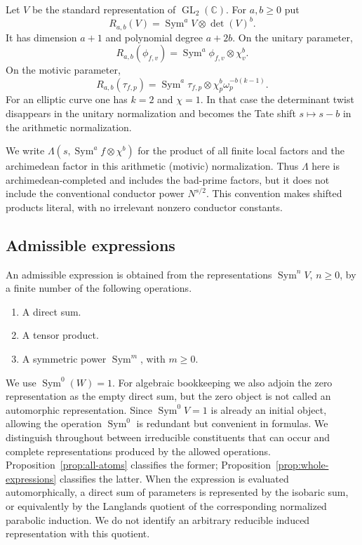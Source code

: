 \documentclass[11pt,reqno]{amsart}
\theoremstyle{definition}
\theoremstyle{remark}
\newcommand{\C}{\mathbb C}
\newcommand{\GL}{\operatorname{GL}}
\newcommand{\Sym}{\operatorname{Sym}}
\begin{document}
Let $V$ be the standard representation of $\GL_2(\C)$.
For $a,b\geq0$ put
\begin{equation}\label{eq:Rab}
 R_{a,b}(V)=\Sym^aV\otimes\det(V)^b.
\end{equation}
It has dimension $a+1$ and polynomial degree $a+2b$.
On the unitary parameter,
\begin{equation}\label{eq:Rab-unitary-general}
 R_{a,b}(\phi_{f,v})
 =\Sym^a\phi_{f,v}\otimes\chi_v^b.
\end{equation}
On the motivic parameter,
\begin{equation}\label{eq:Rab-motivic}
 R_{a,b}(\tau_{f,p})
 =\Sym^a\tau_{f,p}\otimes\chi_p^b\omega_p^{-b(k-1)}.
\end{equation}
For an elliptic curve one has $k=2$ and $\chi=1$.
In that case the determinant twist disappears in the unitary normalization and becomes the Tate shift $s\mapsto s-b$ in the arithmetic normalization.

We write $\Lambda(s,\Sym^af\otimes\chi^b)$ for the product of all finite local factors and the archimedean factor in this arithmetic (motivic) normalization.
Thus $\Lambda$ here is archimedean-completed and includes the bad-prime factors, but it does not include the conventional conductor power $N^{s/2}$.
This convention makes shifted products literal, with no irrelevant nonzero conductor constants.

\subsection{Admissible expressions}

An admissible expression is obtained from the representations $\Sym^nV$,
$n\geq0$, by a finite number of the following operations.
\begin{enumerate}
 \item A direct sum.
 \item A tensor product.
 \item A symmetric power $\Sym^m$, with $m\geq0$.
\end{enumerate}
We use $\Sym^0(W)=1$.  For algebraic bookkeeping we also adjoin the zero
representation as the empty direct sum, but the zero object is not called an
automorphic representation.  Since $\Sym^0V=1$ is already an initial object,
allowing the operation $\Sym^0$ is redundant but convenient in formulas.
We distinguish throughout between irreducible constituents that can occur
and complete representations produced by the allowed operations.
Proposition~\ref{prop:all-atoms} classifies the former;
Proposition~\ref{prop:whole-expressions} classifies the latter.
When the expression is evaluated automorphically, a direct sum of parameters
is represented by the isobaric sum, or equivalently by the Langlands quotient
of the corresponding normalized parabolic induction.  We do not identify an
arbitrary reducible induced representation with this quotient.
\end{document}
